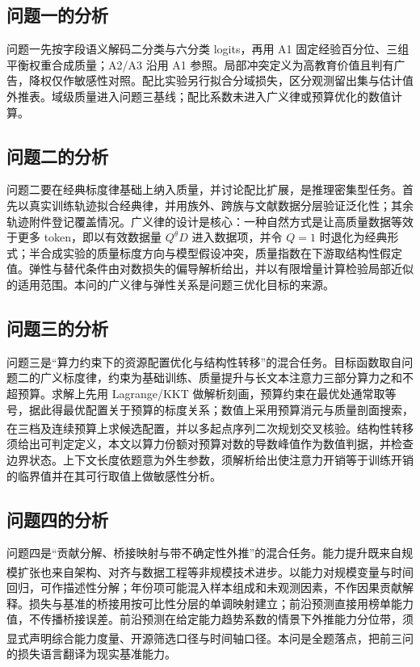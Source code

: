 \documentclass[zihao=-4,a4paper]{ctexart}
\newcommand{\Dt}{D}
\let\oldcite\cite
\renewcommand{\cite}[1]{\textsuperscript{\oldcite{#1}}}
\begin{document}
\subsection{问题一的分析}
问题一先按字段语义解码二分类与六分类 logits，再用 A1 固定经验百分位、三组平衡权重合成质量；A2/A3 沿用 A1 参照。局部冲突定义为高教育价值且判有广告，降权仅作敏感性对照。配比实验另行拟合分域损失，区分观测留出集与估计值外推表。域级质量进入问题三基线；配比系数未进入广义律或预算优化的数值计算。

\subsection{问题二的分析}
问题二要在经典标度律基础上纳入质量，并讨论配比扩展，是推理密集型任务。首先以真实训练轨迹拟合经典律，并用族外、跨族与文献数据分层验证泛化性；其余轨迹附件登记覆盖情况。广义律的设计是核心：一种自然方式是让高质量数据等效于更多 token，即以有效数据量 $Q^{\theta}\Dt$ 进入数据项，并令 $Q=1$ 时退化为经典形式；半合成实验的质量标度方向与模型假设冲突，质量指数在下游取结构性假定值。弹性与替代条件由对数损失的偏导解析给出，并以有限增量计算检验局部近似的适用范围。本问的广义律与弹性关系是问题三优化目标的来源。

\subsection{问题三的分析}
问题三是“算力约束下的资源配置优化与结构性转移”的混合任务。目标函数取自问题二的广义标度律，约束为基础训练、质量提升与长文本注意力三部分算力之和不超预算。求解上先用 Lagrange/KKT 做解析刻画，预算约束在最优处通常取等号，据此得最优配置关于预算的标度关系；数值上采用预算消元与质量剖面搜索，在三档及连续预算上求候选配置，并以多起点序列二次规划\cite{sqp1995}交叉核验。结构性转移须给出可判定定义，本文以算力份额对预算对数的导数峰值作为数值判据，并检查边界状态。上下文长度依题意为外生参数，须解析给出使注意力开销等于训练开销的临界值并在其可行取值上做敏感性分析。

\subsection{问题四的分析}
问题四是“贡献分解、桥接映射与带不确定性外推”的混合任务。能力提升既来自规模扩张也来自架构、对齐与数据工程等非规模技术进步\cite{gpt3_2020,emergent2022}。以能力对规模变量与时间回归，可作描述性分解；年份项可能混入样本组成和未观测因素，不作因果贡献解释。损失与基准的桥接用按可比性分层的单调映射建立；前沿预测直接用榜单能力值，不传播桥接误差。前沿预测在给定能力趋势系数的情景下外推能力分位带，须显式声明综合能力度量、开源筛选口径与时间轴口径\cite{helm2022,mmlu2020}。本问是全题落点，把前三问的损失语言翻译为现实基准能力。
\end{document}
